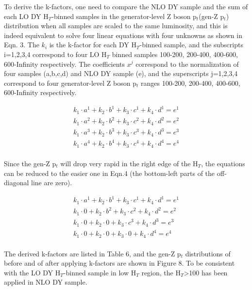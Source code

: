 \documentclass{article}
\begin{document}
To derive the k-factors, one need to compare the NLO DY sample and the sum of each LO DY H$_{T}$-binned samples in the generator-level Z boson p$_{t}$(gen-Z p$_{t}$) distribution when all samples are scaled to the same luminosity, and this is indeed equivalent to solve four linear equations with four unknowns as shown in Eqn. 3. The $k_{i}$ is the k-factor for each DY H$_{T}$-binned sample, and the subscripts i=1,2,3,4 correspond to four LO H$_{T}$ binned samples 100-200, 200-400, 400-600, 600-Infinity respectively. The coefficients $x^{j}$ correspond to the normalization of four samples (a,b,c,d) and NLO DY sample (e), and the superscripts j=1,2,3,4 correspond to four generator-level Z boson p$_{t}$ ranges 100-200, 200-400, 400-600, 600-Infinity respectively.   

\begin{equation}
\begin{split}
k_{1}\cdot a^{1}+k_{2}\cdot b^{1}+k_{3}\cdot c^{1}+k_{4}\cdot d^{1}=e^{1} \\ 
k_{1}\cdot a^{2}+k_{2}\cdot b^{2}+k_{3}\cdot c^{2}+k_{4}\cdot d^{2}=e^{2} \\ 
k_{1}\cdot a^{3}+k_{2}\cdot b^{3}+k_{3}\cdot c^{3}+k_{4}\cdot d^{3}=e^{3} \\ 
k_{1}\cdot a^{4}+k_{2}\cdot b^{4}+k_{3}\cdot c^{4}+k_{4}\cdot d^{4}=e^{4} \\ 
\end{split}
\end{equation}

Since the gen-Z p$_{t}$ will drop very rapid in the right edge of the H$_{T}$, the equations can be reduced to the easier one in Eqn.4 (the bottom-left parts of the off-diagonal line are zero). 

\begin{equation}
\begin{split}
k_{1}\cdot a^{1}+k_{2}\cdot b^{1}+k_{3}\cdot c^{1}+k_{4}\cdot d^{1}=e^{1} \\ 
k_{1}\cdot 0    +k_{2}\cdot b^{2}+k_{3}\cdot c^{2}+k_{4}\cdot d^{2}=e^{2} \\ 
k_{1}\cdot 0    +k_{2}\cdot 0    +k_{3}\cdot c^{3}+k_{4}\cdot d^{3}=e^{3} \\ 
k_{1}\cdot 0    +k_{2}\cdot 0    +k_{3}\cdot 0    +k_{4}\cdot d^{4}=e^{4} \\ 
\end{split}
\end{equation}

The derived k-factors are listed in Table 6, and the gen-Z p$_{t}$ distributions of before and of after applying k-factors are shown in Figure 8. To be consistent with the LO DY H$_{T}$-binned sample in low H$_{T}$ region, the H$_{T}$\textgreater 100 has been applied in NLO DY sample.  
\end{document}
